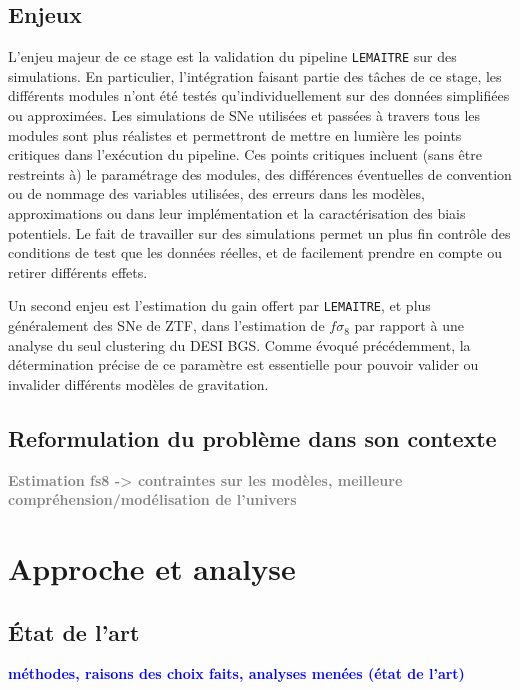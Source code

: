 \documentclass{book}
\newcommand{\todo}[1]{{\textcolor{gray}{\bf \large #1}}}
\newcommand{\consignes}[1]{{\textcolor{blue}{\bf \large #1}}}
\def\lemaitre{\texttt{LEMAITRE}\xspace}
\begin{document}
\section{Enjeux}

L'enjeu majeur de ce stage est la validation du pipeline \lemaitre sur des simulations. En particulier, l'intégration faisant partie des tâches de ce stage, les différents modules n'ont été testés qu'individuellement sur des données simplifiées ou approximées. Les simulations de SNe utilisées et passées à travers tous les modules sont plus réalistes et permettront de mettre en lumière les points critiques dans l'exécution du pipeline. Ces points critiques incluent (sans être restreints à) le paramétrage des modules, des différences éventuelles de convention ou de nommage des variables utilisées, des erreurs dans les modèles, approximations ou dans leur implémentation et la caractérisation des biais potentiels.
Le fait de travailler sur des simulations permet un plus fin contrôle des conditions de test que les données réelles, et de facilement prendre en compte ou retirer différents effets.

Un second enjeu est l'estimation du gain offert par \lemaitre, et plus généralement des SNe de ZTF, dans l'estimation de $f\sigma_8$ par rapport à une analyse du seul clustering du DESI BGS. Comme évoqué précédemment, la détermination précise de ce paramètre est essentielle pour pouvoir valider ou invalider différents modèles de gravitation.



\section{Reformulation du problème dans son contexte}

\todo{Estimation fs8 -> contraintes sur les modèles, meilleure compréhension/modélisation de l'univers}


\chapter{Approche et analyse}

\section{État de l'art}
\consignes{méthodes, raisons des choix faits, analyses menées (état de l’art)}
\end{document}
